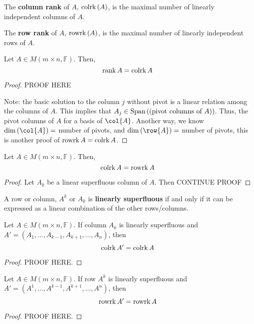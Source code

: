 \documentclass[letterpaper,12pt]{article}
\begin{document}
\begin{definition}
The \textbf{column rank} of $A$, $\operatorname{colrk}{(A)}$, is the maximal number of linearly independent columns of $A$.
\end{definition}

\begin{definition}
The \textbf{row rank} of $A$, $\operatorname{rowrk}{(A)}$, is the maximal number of linearly independent rows of $A$.
\end{definition}

\begin{theorem}
Let $A \in M(m \times n, \mathbb{F})$. Then,
\begin{equation*}
    \operatorname{rank}{A} = \operatorname{colrk}{A}
\end{equation*}
\end{theorem}
\begin{proof}
PROOF HERE

Note: the basic solution to the column $j$ without pivot is a linear relation among the columns of $A$. This implies that $A_j \in \text{Span}\left((\text{pivot columns of $A$}) \right)$. Thus, the pivot columns of $A$ for a basis of $\col{A}$. Another way, we know $\dim{(\col{A})} =$ number of pivots, and $\dim{(\row{A})} = $ number of pivots, this is another proof of $\operatorname{rowrk}{A} = \operatorname{colrk}{A}$.
\end{proof}




\begin{theorem}
Let $A \in M(m \times n, \mathbb{F})$. Then,
\begin{equation*}
    \operatorname{colrk}{A} = \operatorname{rowrk}{A}
\end{equation*}
\end{theorem}
\begin{proof}
Let $A_k$ be a linear superfluous column of $A$. Then CONTINUE PROOF
\end{proof}

\begin{definition}
A row or column, $A^k$ or $A_k$ is \textbf{linearly superfluous} if and only if it can be expressed as a linear combination of the other rows/columns.
\end{definition}

\begin{theorem}
Let $A \in M(m \times n, \mathbb{F})$. If column $A_k$ is linearly superfluous and
\\ $A' = (A_1, \dots, A_{k-1}, A_{k+1}, \dots, A_n)$, then
\begin{equation*}
    \operatorname{colrk}{A'} = \operatorname{colrk}{A}
\end{equation*}
\end{theorem}
\begin{proof}
PROOF HERE.
\end{proof}

\begin{theorem}
Let $A \in M(m \times n, \mathbb{F})$. If row $A^k$ is linearly superfluous and
\\ $A' = (A^1, \dots, A^{k-1}, A^{k+1}, \dots, A^n)$, then
\begin{equation*}
    \operatorname{rowrk}{A'} = \operatorname{rowrk}{A}
\end{equation*}
\end{theorem}
\begin{proof}
PROOF HERE.
\end{proof}
\end{document}
